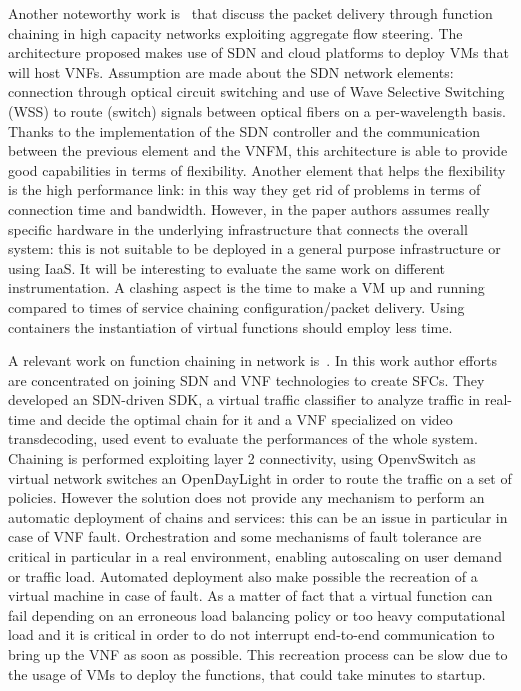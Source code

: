 Another noteworthy work is~\cite{xia2015optical} that discuss the packet
delivery through function chaining in high capacity networks exploiting
aggregate flow steering. The architecture proposed makes use of SDN and cloud
platforms to deploy VMs that will host VNFs. Assumption are made about the SDN
network elements: connection through optical circuit switching and use of Wave
Selective Switching (WSS) to route (switch) signals between optical fibers on a
per-wavelength basis. Thanks to the implementation of the SDN controller and the
communication between the previous element and the VNFM, this architecture is
able to provide good capabilities in terms of flexibility. Another element that
helps the flexibility is the high performance link: in this way they get rid of
problems in terms of connection time and bandwidth. However, in the paper
authors assumes really specific hardware in the underlying infrastructure that
connects the overall system: this is not suitable to be deployed in a general
purpose infrastructure or using IaaS. It will be interesting to evaluate the
same work on different instrumentation. A clashing aspect is the time to make a
VM up and running compared to times of service chaining configuration/packet
delivery. Using containers the instantiation of virtual functions should employ
less time.

A relevant work on function chaining in network is~\cite{trajkovska2017sdn}. In
this work author efforts are concentrated on joining SDN and VNF technologies to
create SFCs. They developed an SDN-driven SDK, a virtual traffic classifier to
analyze traffic in real-time and decide the optimal chain for it and a VNF
specialized on video transdecoding, used event to evaluate the performances of
the whole system. Chaining is performed exploiting layer 2 connectivity, using
OpenvSwitch as virtual network switches an OpenDayLight in order to route the
traffic on a set of policies. However the solution does not provide any
mechanism to perform an automatic deployment of chains and services: this can be
an issue in particular in case of VNF fault. Orchestration and some mechanisms
of fault tolerance are critical in particular in a real environment, enabling
autoscaling on user demand or traffic load. Automated deployment also make
possible the recreation of a virtual machine in case of fault. As a matter of
fact that a virtual function can fail depending on an erroneous load balancing
policy or too heavy computational load and it is critical in order to do not
interrupt end-to-end communication to bring up the VNF as soon as possible. This
recreation process can be slow due to the usage of VMs to deploy the functions,
that could take minutes to startup.

